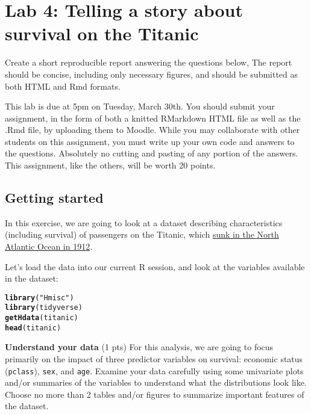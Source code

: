 \documentclass{article}\usepackage[]{graphicx}\usepackage[]{color}
\makeatletter
\newcommand{\hlstr}[1]{\textcolor[rgb]{0.192,0.494,0.8}{#1}}%
\newcommand{\hlstd}[1]{\textcolor[rgb]{0.345,0.345,0.345}{#1}}%
\newcommand{\hlkwd}[1]{\textcolor[rgb]{0.737,0.353,0.396}{\textbf{#1}}}%
\newenvironment{kframe}{%
 \def\at@end@of@kframe{}%
 \ifinner\ifhmode%
  \def\at@end@of@kframe{\end{minipage}}%
  \begin{minipage}{\columnwidth}%
 \fi\fi%
 \def\FrameCommand##1{\hskip\@totalleftmargin \hskip-\fboxsep
 \colorbox{shadecolor}{##1}\hskip-\fboxsep
     \hskip-\linewidth \hskip-\@totalleftmargin \hskip\columnwidth}%
 \MakeFramed {\advance\hsize-\width
   \@totalleftmargin\z@ \linewidth\hsize
   \@setminipage}}%
 {\par\unskip\endMakeFramed%
 \at@end@of@kframe}
\newenvironment{knitrout}{}{} %
\makeatother
\begin{document}

\section*{Lab 4: Telling a story about survival on the Titanic}

Create a short reproducible report answering the questions below, The report should be concise, including only necessary figures, and should be submitted as both HTML and Rmd formats. 

This lab is due at 5pm on Tuesday, March 30th. You should submit your assignment, in the form of both a knitted RMarkdown HTML file as well as the .Rmd file, by uploading them to Moodle. While you may collaborate with other students on this assignment, you must write up your own code and answers to the questions. Absolutely no cutting and pasting of any portion of the answers. This assignment, like the others, will be worth 20 points.

\subsection*{Getting started}
In this exercise, we are going to look at a dataset describing characteristics (including survival) of passengers on the Titanic, which \href{https://en.wikipedia.org/wiki/RMS_Titanic}{sunk in the North Atlantic Ocean in 1912}. 

Let's load the data into our current R session, and look at the variables available in the dataset:

\begin{knitrout}
\color{fgcolor}\begin{kframe}
\begin{alltt}
\hlkwd{library}\hlstd{(}\hlstr{"Hmisc"}\hlstd{)}
\hlkwd{library}\hlstd{(tidyverse)}
\hlkwd{getHdata}\hlstd{(titanic)}
\hlkwd{head}\hlstd{(titanic)}
\end{alltt}
\end{kframe}
\end{knitrout}

\begin{exercise}
{\bf Understand your data} (1 pts)
For this analysis, we are going to focus primarily on the impact of three predictor variables on survival: economic status ({\tt pclass}), {\tt sex}, and {\tt age}. Examine your data carefully using some univariate plots and/or summaries of the variables to understand what the distributions look like. Choose no more than 2 tables and/or figures to summarize important features of the dataset.
\end{exercise}
\end{document}

